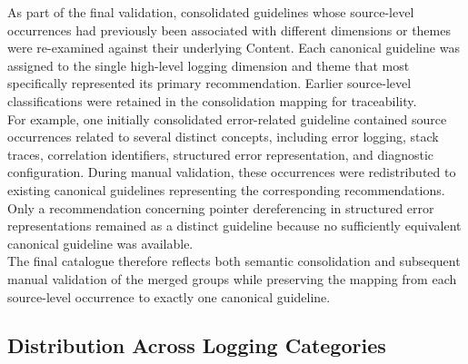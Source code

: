 As part of the final validation, consolidated guidelines whose source-level
occurrences had previously been associated with different dimensions or themes
were re-examined against their underlying Content. Each canonical guideline
was assigned to the single high-level logging dimension and theme that most
specifically represented its primary recommendation. Earlier source-level
classifications were retained in the consolidation mapping for traceability.
\\
For example, one initially consolidated error-related guideline contained source occurrences related to
several distinct concepts, including error logging, stack traces, correlation identifiers, structured 
error representation, and diagnostic configuration. During manual validation, these occurrences were 
redistributed to existing canonical guidelines representing the corresponding recommendations. 
Only a recommendation concerning pointer dereferencing in structured error representations 
remained as a distinct guideline because no sufficiently equivalent canonical guideline was available.
\\
The final catalogue therefore reflects both semantic consolidation and subsequent manual 
validation of the merged groups while preserving the mapping from each source-level 
occurrence to exactly one canonical guideline.

\subsection{Distribution Across Logging Categories}

